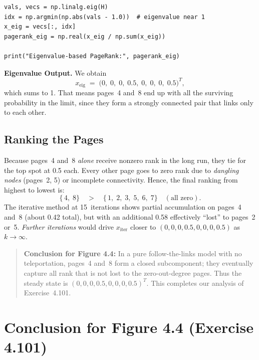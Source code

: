 \documentclass{article}
\begin{document}
\begin{verbatim}
vals, vecs = np.linalg.eig(H)
idx = np.argmin(np.abs(vals - 1.0))  # eigenvalue near 1
x_eig = vecs[:, idx]
pagerank_eig = np.real(x_eig / np.sum(x_eig))

print("Eigenvalue-based PageRank:", pagerank_eig)
\end{verbatim}

\noindent
\textbf{Eigenvalue Output.}  We obtain
\[
  x_{\mathrm{eig}}
  \;=\;
  \bigl(
    0,\;0,\;0,\;0.5,\;0,\;0,\;0,\;0.5
  \bigr)^T,
\]
which sums to 1.  That means pages~4 and~8 end up with all the surviving probability 
in the limit, since they form a strongly connected pair that links only to each other.

\subsection{Ranking the Pages}

Because pages~4 and~8 \emph{alone} receive nonzero rank in the long run, they tie for 
the top spot at 0.5 each.  Every other page goes to zero rank due to 
\emph{dangling nodes} (pages~2, 5) or incomplete connectivity.  Hence, the final 
ranking from highest to lowest is:
\[
  \{\,4,\;8\} \quad>\quad 
  \{\,1,\;2,\;3,\;5,\;6,\;7\} 
  \quad(\text{all zero}).
\]
The iterative method at 15~iterations shows partial accumulation on pages~4 and~8 
(about 0.42 total), but with an additional 0.58 effectively ``lost'' to pages~2 or~5.  
\emph{Further iterations} would drive $x_{\mathrm{iter}}$ closer to $(0,0,0,0.5,0,0,0,0.5)$ 
as $k\to\infty.$

\begin{quote}
\textbf{Conclusion for Figure 4.4:} In a pure follow-the-links model with no 
teleportation, pages~4 and~8 form a closed subcomponent; 
they eventually capture all rank that is not lost to the zero-out-degree pages. 
Thus the steady state is $(0,0,0,0.5,0,0,0,0.5)^T.$  This completes our analysis 
of Exercise~4.101.
\end{quote}





\section{Conclusion for Figure 4.4 (Exercise 4.101)}
\label{sec:conclusion-fig4-4}
\end{document}
